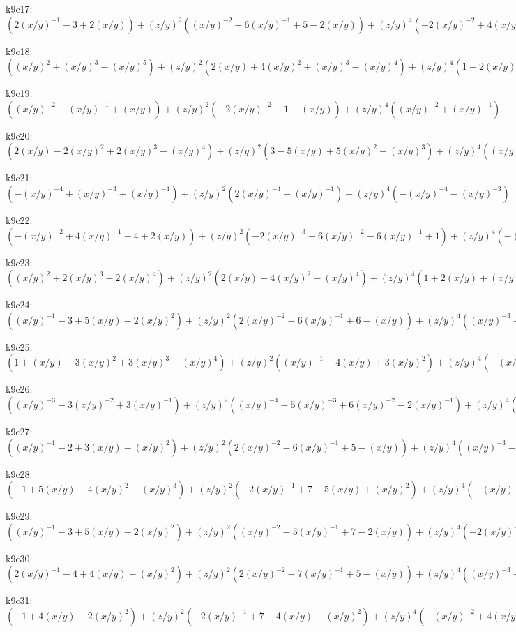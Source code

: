 k9c17: $ (2(x/y)^{-1}-3+2(x/y))  +(z/y)^{2}((x/y)^{-2}-6(x/y)^{-1}+5-2(x/y))  +(z/y)^{4}(-2(x/y)^{-2}+4(x/y)^{-1}-1)  +(x/y)^{-2}(z/y)^{6} $ 

k9c18: $ ((x/y)^{2}+(x/y)^{3}-(x/y)^{5})  +(z/y)^{2}(2(x/y)+4(x/y)^{2}+(x/y)^{3}-(x/y)^{4})  +(z/y)^{4}(1+2(x/y)+(x/y)^{2}) $ 

k9c19: $ ((x/y)^{-2}-(x/y)^{-1}+(x/y))  +(z/y)^{2}(-2(x/y)^{-2}+1-(x/y))  +(z/y)^{4}((x/y)^{-2}+(x/y)^{-1}) $ 

k9c20: $ (2(x/y)-2(x/y)^{2}+2(x/y)^{3}-(x/y)^{4})  +(z/y)^{2}(3-5(x/y)+5(x/y)^{2}-(x/y)^{3})  +(z/y)^{4}((x/y)^{-1}-4+2(x/y))  -(x/y)^{-1}(z/y)^{6} $ 

k9c21: $ (-(x/y)^{-4}+(x/y)^{-3}+(x/y)^{-1})  +(z/y)^{2}(2(x/y)^{-4}+(x/y)^{-1})  +(z/y)^{4}(-(x/y)^{-4}-(x/y)^{-3}) $ 

k9c22: $ (-(x/y)^{-2}+4(x/y)^{-1}-4+2(x/y))  +(z/y)^{2}(-2(x/y)^{-3}+6(x/y)^{-2}-6(x/y)^{-1}+1)  +(z/y)^{4}(-(x/y)^{-4}+4(x/y)^{-3}-2(x/y)^{-2})  +(x/y)^{-4}(z/y)^{6} $ 

k9c23: $ ((x/y)^{2}+2(x/y)^{3}-2(x/y)^{4})  +(z/y)^{2}(2(x/y)+4(x/y)^{2}-(x/y)^{4})  +(z/y)^{4}(1+2(x/y)+(x/y)^{2}) $ 

k9c24: $ ((x/y)^{-1}-3+5(x/y)-2(x/y)^{2})  +(z/y)^{2}(2(x/y)^{-2}-6(x/y)^{-1}+6-(x/y))  +(z/y)^{4}((x/y)^{-3}-4(x/y)^{-2}+2(x/y)^{-1})  -(x/y)^{-3}(z/y)^{6} $ 

k9c25: $ (1+(x/y)-3(x/y)^{2}+3(x/y)^{3}-(x/y)^{4})  +(z/y)^{2}((x/y)^{-1}-4(x/y)+3(x/y)^{2})  +(z/y)^{4}(-(x/y)^{-1}-2) $ 

k9c26: $ ((x/y)^{-3}-3(x/y)^{-2}+3(x/y)^{-1})  +(z/y)^{2}((x/y)^{-4}-5(x/y)^{-3}+6(x/y)^{-2}-2(x/y)^{-1})  +(z/y)^{4}(-2(x/y)^{-4}+4(x/y)^{-3}-(x/y)^{-2})  +(x/y)^{-4}(z/y)^{6} $ 

k9c27: $ ((x/y)^{-1}-2+3(x/y)-(x/y)^{2})  +(z/y)^{2}(2(x/y)^{-2}-6(x/y)^{-1}+5-(x/y))  +(z/y)^{4}((x/y)^{-3}-4(x/y)^{-2}+2(x/y)^{-1})  -(x/y)^{-3}(z/y)^{6} $ 

k9c28: $ (-1+5(x/y)-4(x/y)^{2}+(x/y)^{3})  +(z/y)^{2}(-2(x/y)^{-1}+7-5(x/y)+(x/y)^{2})  +(z/y)^{4}(-(x/y)^{-2}+4(x/y)^{-1}-2)  +(x/y)^{-2}(z/y)^{6} $ 

k9c29: $ ((x/y)^{-1}-3+5(x/y)-2(x/y)^{2})  +(z/y)^{2}((x/y)^{-2}-5(x/y)^{-1}+7-2(x/y))  +(z/y)^{4}(-2(x/y)^{-2}+4(x/y)^{-1}-1)  +(x/y)^{-2}(z/y)^{6} $ 

k9c30: $ (2(x/y)^{-1}-4+4(x/y)-(x/y)^{2})  +(z/y)^{2}(2(x/y)^{-2}-7(x/y)^{-1}+5-(x/y))  +(z/y)^{4}((x/y)^{-3}-4(x/y)^{-2}+2(x/y)^{-1})  -(x/y)^{-3}(z/y)^{6} $ 

k9c31: $ (-1+4(x/y)-2(x/y)^{2})  +(z/y)^{2}(-2(x/y)^{-1}+7-4(x/y)+(x/y)^{2})  +(z/y)^{4}(-(x/y)^{-2}+4(x/y)^{-1}-2)  +(x/y)^{-2}(z/y)^{6} $ 

